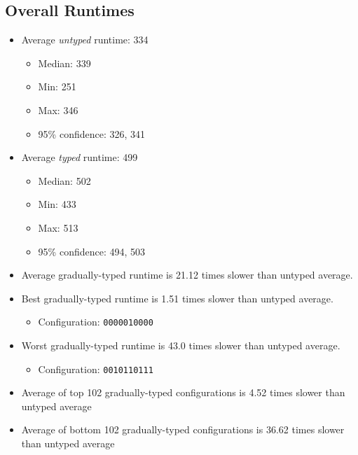 \documentclass{article}
\newcommand{\mono}[1]{\texttt{#1}}
\begin{document}
\subsection{Overall Runtimes}
\begin{itemize}
\item Average \emph{untyped} runtime: 334
  \begin{itemize}
  \item Median: 339
  \item Min: 251
  \item Max: 346
  \item 95\% confidence: 326, 341
  \end{itemize}
\item Average \emph{typed} runtime: 499
  \begin{itemize}
  \item Median: 502
  \item Min: 433
  \item Max: 513
  \item 95\% confidence: 494, 503
  \end{itemize}
\item Average gradually-typed runtime is 21.12 times slower than untyped average.
\item Best gradually-typed runtime is 1.51 times slower than untyped average.
\begin{itemize}\item Configuration: \mono{0000010000}\end{itemize}
\item Worst gradually-typed runtime is 43.0 times slower than untyped average.
\begin{itemize}\item Configuration: \mono{0010110111}\end{itemize}
\item Average of top 102 gradually-typed configurations is 4.52 times slower than untyped average
\item Average of bottom 102 gradually-typed configurations is 36.62 times slower than untyped average
\end{itemize}
\end{document}
